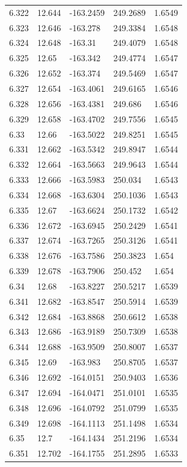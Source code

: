 \begin{tabular}{lllll}
6.322 & 12.644 & -163.2459 & 249.2689 & 1.6549 \\
6.323 & 12.646 & -163.278 & 249.3384 & 1.6548 \\
6.324 & 12.648 & -163.31 & 249.4079 & 1.6548 \\
6.325 & 12.65 & -163.342 & 249.4774 & 1.6547 \\
6.326 & 12.652 & -163.374 & 249.5469 & 1.6547 \\
6.327 & 12.654 & -163.4061 & 249.6165 & 1.6546 \\
6.328 & 12.656 & -163.4381 & 249.686 & 1.6546 \\
6.329 & 12.658 & -163.4702 & 249.7556 & 1.6545 \\
6.33 & 12.66 & -163.5022 & 249.8251 & 1.6545 \\
6.331 & 12.662 & -163.5342 & 249.8947 & 1.6544 \\
6.332 & 12.664 & -163.5663 & 249.9643 & 1.6544 \\
6.333 & 12.666 & -163.5983 & 250.034 & 1.6543 \\
6.334 & 12.668 & -163.6304 & 250.1036 & 1.6543 \\
6.335 & 12.67 & -163.6624 & 250.1732 & 1.6542 \\
6.336 & 12.672 & -163.6945 & 250.2429 & 1.6541 \\
6.337 & 12.674 & -163.7265 & 250.3126 & 1.6541 \\
6.338 & 12.676 & -163.7586 & 250.3823 & 1.654 \\
6.339 & 12.678 & -163.7906 & 250.452 & 1.654 \\
6.34 & 12.68 & -163.8227 & 250.5217 & 1.6539 \\
6.341 & 12.682 & -163.8547 & 250.5914 & 1.6539 \\
6.342 & 12.684 & -163.8868 & 250.6612 & 1.6538 \\
6.343 & 12.686 & -163.9189 & 250.7309 & 1.6538 \\
6.344 & 12.688 & -163.9509 & 250.8007 & 1.6537 \\
6.345 & 12.69 & -163.983 & 250.8705 & 1.6537 \\
6.346 & 12.692 & -164.0151 & 250.9403 & 1.6536 \\
6.347 & 12.694 & -164.0471 & 251.0101 & 1.6535 \\
6.348 & 12.696 & -164.0792 & 251.0799 & 1.6535 \\
6.349 & 12.698 & -164.1113 & 251.1498 & 1.6534 \\
6.35 & 12.7 & -164.1434 & 251.2196 & 1.6534 \\
6.351 & 12.702 & -164.1755 & 251.2895 & 1.6533 \\

\end{tabular}
